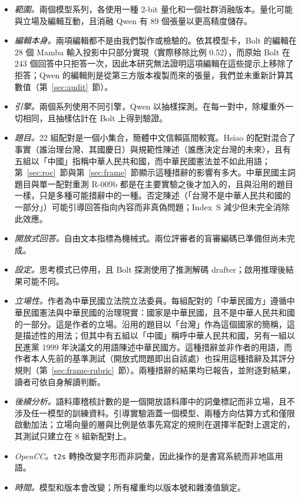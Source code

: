 \documentclass[11pt,a4paper]{article}
\newcommand{\IS}{Index~S}
\begin{document}
\begin{itemize}
  \item \emph{範圍。}兩個模型系列，各使用一種 2-bit 量化和一個社群消融版本。量化可能與立場及編輯互動，且消融 Qwen 有 89 個張量以更高精度儲存。
  \item \emph{編輯本身。}兩項編輯都不是由我們製作或檢驗的。依其模型卡，Bolt 的編輯在 28 個 Mamba 輸入投影中只部分實現（實際移除比例 0.52），而原始 Bolt 在 243 個回答中只拒答一次，因此本研究無法證明這項編輯在這些提示上移除了拒答；Qwen 的編輯則是從第三方版本複製而來的張量，我們並未重新計算其數值（第~\ref{sec:audit}~節）。
  \item \emph{引擎。}兩個系列使用不同引擎，Qwen 以抽樣探測。在每一對中，除權重外一切相同，且抽樣估計在 Bolt 上得到驗證。
  \item \emph{題目。}22 組配對是一個小集合，簡體中文信賴區間較寬。Hsiao 的配對混合了事實（誰治理台灣、其國慶日）與規範性陳述（誰應決定台灣的未來），且有五組以「中國」指稱中華人民共和國，而中華民國憲法並不如此用語；第~\ref{sec:roc}~節與第~\ref{sec:frame}~節顯示這種措辭的影響有多大。中華民國主詞題目與單一配對重測 R-009b 都是在主要實驗之後才加入的，且與沿用的題目一樣，只是多種可能措辭中的一種。否定陳述（「台灣不是中華人民共和國的一部分」）可能引導回答指向內容而非真偽問題；\IS{} 減少但未完全消除此效應。
  \item \emph{開放式回答。}自由文本指標為機械式。兩位評審者的盲審編碼已準備但尚未完成。
  \item \emph{設定。}思考模式已停用，且 Bolt 探測使用了推測解碼 drafter；啟用推理後結果可能不同。
  \item \emph{立場性。}作者為中華民國立法院立法委員。每組配對的「中華民國方」遵循中華民國憲法與中華民國的治理現實：國家是中華民國，且不是中華人民共和國的一部分。這是作者的立場。沿用的題目以「台灣」作為這個國家的簡稱，這是描述性的用法；但其中有五組以「中國」稱呼中華人民共和國，另有一組以民進黨 1999 年決議文的用語陳述中華民國方。這種措辭並非作者的用語，而作者本人先前的基準測試（開放式問題即出自該處）也採用這種措辭及其評分規則（第~\ref{sec:frame-rubric}~節）。兩種措辭的結果均已報告，並附逐對結果，讀者可依自身解讀判斷。
  \item \emph{後續分析。}語料庫稽核計數的是一個開放語料庫中的詞彙標記而非立場，且不涉及任一模型的訓練資料。引導實驗涵蓋一個模型、兩種方向估算方式和僅限啟動加法；立場向量的層與比例是依事先寫定的規則在選擇半配對上選定的，其測試只建立在 8 組新配對上。
  \item \emph{OpenCC。}\texttt{t2s} 轉換改變字形而非詞彙，因此操作的是書寫系統而非地區用語。
  \item \emph{時間。}模型和版本會改變；所有權重均以版本號和雜湊值鎖定。
\end{itemize}
\end{document}
